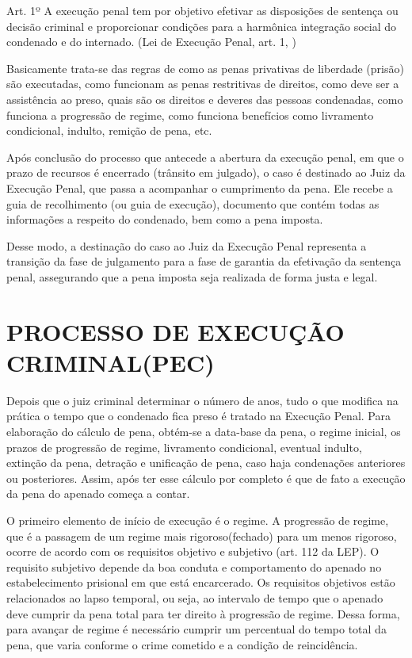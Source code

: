 \begin{citacao}
Art. 1º A execução penal tem por objetivo efetivar as disposições de sentença ou decisão criminal e proporcionar condições para a harmônica integração social do condenado e do internado.
(Lei de Execução Penal, art. 1, \cite{lep})
\end{citacao}

Basicamente trata-se das regras de como as penas privativas de liberdade (prisão) são executadas, como funcionam as penas restritivas de direitos, como deve ser a assistência ao preso, quais são os direitos e deveres das pessoas condenadas, como funciona a progressão de regime, como funciona benefícios como livramento condicional, indulto, remição de pena, etc.\cite{lep}

Após conclusão do processo que antecede a abertura da execução penal, em que o prazo de recursos é encerrado (trânsito em julgado), o caso é destinado ao Juiz da Execução Penal, que passa a acompanhar o cumprimento da pena. Ele recebe a guia de recolhimento (ou guia de execução), documento que contém todas as informações a respeito do condenado, bem como a pena imposta.\cite{lep}

Desse modo, a destinação do caso ao Juiz da Execução Penal representa a transição da fase de julgamento para a fase de garantia da efetivação da sentença penal, assegurando que a pena imposta seja realizada de forma justa e legal.\cite{lep}

\section{PROCESSO DE EXECUÇÃO CRIMINAL(PEC)}
Depois que o juiz criminal determinar o número de anos, tudo o que modifica na prática o tempo que o condenado fica preso é tratado na Execução Penal. Para elaboração do cálculo de pena, obtém-se a data-base da pena, o regime inicial, os prazos de progressão de regime, livramento condicional, eventual indulto, extinção da pena, detração e unificação de pena, caso haja condenações anteriores ou posteriores. Assim, após ter esse cálculo por completo é que de fato a execução da pena do apenado começa a contar.\cite{lep}

O primeiro elemento de início de execução é o regime. A progressão de regime, que é a passagem de um regime mais rigoroso(fechado) para um menos rigoroso, ocorre de acordo com os requisitos objetivo e subjetivo (art. 112 da LEP). O requisito subjetivo depende da boa conduta e comportamento do apenado no estabelecimento prisional em que está encarcerado. Os requisitos objetivos estão relacionados ao lapso temporal, ou seja, ao intervalo de tempo que o apenado deve cumprir da pena total para ter direito à progressão de regime. Dessa forma, para avançar de regime é necessário cumprir um percentual do tempo total da pena, que varia conforme o crime cometido e a condição de reincidência.\cite{lep}

